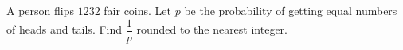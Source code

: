 A person flips $1232$ fair coins. Let $p$ be the probability of getting equal numbers of heads and tails. Find $\dfrac{1}{p}$ rounded to the nearest integer.
